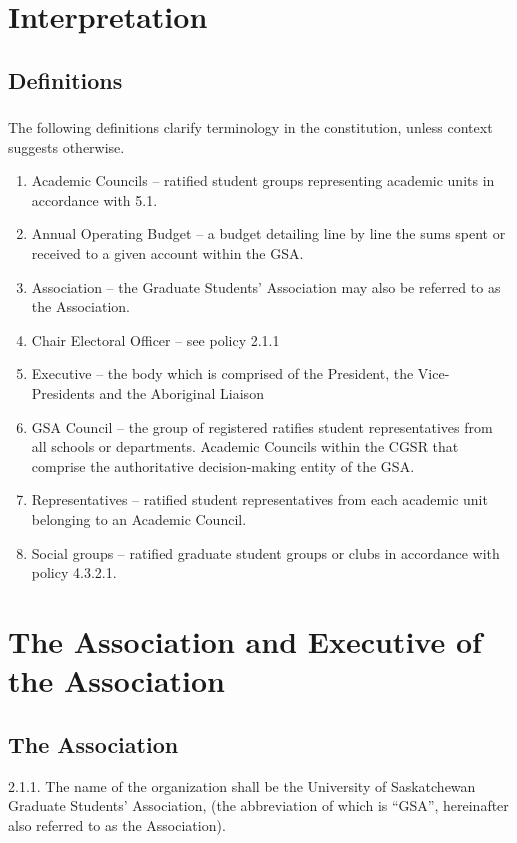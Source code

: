 \documentclass{article}
\begin{document}
\tableofcontents
\section{Interpretation}
\subsection{Definitions} 
\subsubsection {}The following definitions clarify terminology in the constitution, unless context suggests otherwise. 
\begin{enumerate}[i]
\item Academic Councils – ratified student groups representing academic units in accordance with 5.1. 
\item Annual Operating Budget – a budget detailing line by line the sums spent or received to a given account within the GSA. 
\item Association – the Graduate Students’ Association may also be referred to as the Association. 
\item Chair Electoral Officer – see policy 2.1.1 
\item Executive – the body which is comprised of the President, the Vice-Presidents and the Aboriginal Liaison 
\item GSA Council – the group of registered ratifies student representatives from all schools or departments. Academic Councils within the CGSR that comprise the authoritative decision-making entity of the GSA. 
\item  Representatives – ratified student representatives from each academic unit belonging to an Academic Council. 
\item  Social groups – ratified graduate student groups or clubs in accordance with policy 4.3.2.1. 
\end{enumerate}

\section{The Association and Executive of the Association }
\subsection{ The Association }
2.1.1. The name of the organization shall be the University of Saskatchewan Graduate Students’ Association, (the abbreviation of which is “GSA”, hereinafter also referred to as the Association). 
\end{document}
